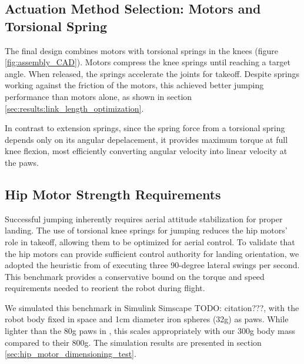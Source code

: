 \subsection{Actuation Method Selection: Motors and Torsional Spring}

The final design combines motors with torsional springs in the knees (figure \ref{fig:assembly_CAD}). Motors compress the knee springs until reaching a target angle. When released, the springs accelerate the joints for takeoff. Despite springs working against the friction of the motors, this achieved better jumping performance than motors alone, as shown in section \ref{sec:results:link_length_optimization}. 

In contrast to extension springs, since the spring force from a torsional spring depends only on its angular depelacement, it provides maximum torque at full knee flexion, most efficiently converting angular velocity into linear velocity at the paws.


\subsection{Hip Motor Strength Requirements}
\label{sec:hip_motor_dimensioning_test_design}

Successful jumping inherently requires aerial attitude stabilization for proper landing. The use of torsional knee springs for jumping reduces the hip motors' role in takeoff, allowing them to be optimized for aerial control. To validate that the hip motors can provide sufficient control authority for landing orientation, we adopted the heuristic from \cite{finn_tarek_master} of executing three 90-degree lateral swings per second. This benchmark provides a conservative bound on the torque and speed requirements needed to reorient the robot during flight.

We simulated this benchmark in Simulink Simscape TODO: citation???, with the robot body fixed in space and 1cm diameter iron spheres (32g) as paws. While lighter than the 80g paws in \cite{finn_tarek_master}, this scales appropriately with our 300g body mass compared to their 800g. The simulation results are presented in section \ref{sec:hip_motor_dimensioning_test}.
